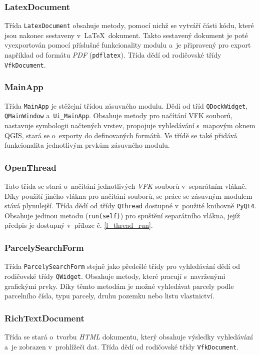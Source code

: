 \documentclass[a4paper,12pt,oneside]{book}
\newcommand{\latex}{\LaTeX}
\begin{document}
\subsubsection{LatexDocument}
Třída \texttt{LatexDocument} obsahuje metody, pomocí nichž se vytváří
části kódu, které jsou nakonec sestaveny v~\latex~dokument. Takto
sestavený dokument je poté vyexportován pomocí příslušné funkcionality
modulu a~je připravený pro export například od formátu \textit{PDF}
(\texttt{pdflatex}). Třída dědí od rodičovské třídy
\texttt{VfkDocument}.

\subsubsection{MainApp}
Třída \texttt{MainApp} je stěžejní třídou zásuvného modulu. Dědí od
tříd \texttt{QDockWidget}, \texttt{QMainWindow}
a~\texttt{Ui\_MainApp}. Obsahuje metody pro načítání VFK souborů,
nastavuje symbologii načtených vrstev, propojuje vyhledávání s~mapovým
oknem QGIS, stará se o~exporty do definovaných formátů. Ve třídě se
také přidává funkcionalita jednotlivým prvkům zásuvného modulu.

\subsubsection{OpenThread}
Tato třída se stará o~načítání jednotlivých \textit{VFK} souborů
v~separátním vlákně. Díky použití jiného vlákna pro načítání souborů,
se práce se zásuvným modulem stává plynulejší. Třída dědí od třídy
\texttt{QThread} dostupné v~použité knihovně \texttt{PyQt4}. Obsahuje
jedinou metodu (\texttt{run(self)}) pro spuštění separátního vlákna,
jejíž předpis je dostupný v~příloze č. \ref{l_thread_run}.

\subsubsection{ParcelySearchForm}
Třída \texttt{ParcelySearchForm} stejně jako předešlé třídy pro
vyhledávání dědí od rodičovské třídy \texttt{QWidget}. Obsahuje
metody, které pracují s~navrženými grafickými prvky. Díky těmto
metodám je možné vyhledávat parcely podle parcelního čísla, typu
parcely, druhu pozemku nebo listu vlastnictví.

\subsubsection{RichTextDocument}
Třída se stará o~tvorbu \textit{HTML} dokumentu, který obsahuje
výsledky vyhledávání a~je zobrazen v~prohlížeči dat. Třída dědí od
rodičovské třídy \texttt{VfkDocument}.
\end{document}
